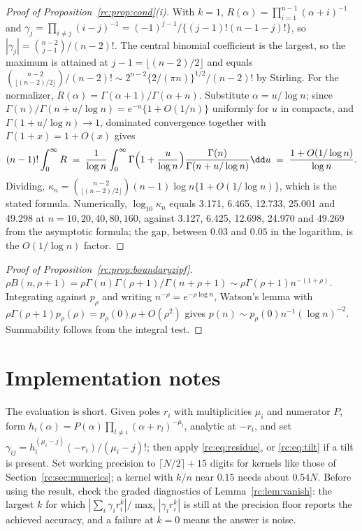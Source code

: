 \begin{proof}[Proof of Proposition~\ref{rc:prop:cond}(i)]
With $k=1$, $R(\alpha)=\prod_{i=1}^{n-1}(\alpha+i)^{-1}$ and $\gamma_j=\prod_{i\ne j}(i-j)^{-1}=(-1)^{j-1}/\{(j-1)!(n-1-j)!\}$, so $|\gamma_j|=\binom{n-2}{j-1}/(n-2)!$. The central binomial coefficient is the largest, so the maximum is attained at $j-1=\lfloor(n-2)/2\rfloor$ and equals $\binom{n-2}{\lfloor(n-2)/2\rfloor}/(n-2)!\sim2^{n-2}\{2/(\pi n)\}^{1/2}/(n-2)!$ by Stirling. For the normalizer, $R(\alpha)=\Gamma(\alpha+1)/\Gamma(\alpha+n)$. Substitute $\alpha=u/\log n$; since $\Gamma(n)/\Gamma(n+u/\log n)=e^{-u}\{1+O(1/n)\}$ uniformly for $u$ in compacts, and $\Gamma(1+u/\log n)\to1$, dominated convergence together with $\Gamma(1+x)=1+O(x)$ gives
\[
(n-1)!\int_0^\infty R\;=\;\frac{1}{\log n}\int_0^\infty\Gamma\Bigl(1+\frac{u}{\log n}\Bigr)\frac{\Gamma(n)}{\Gamma(n+u/\log n)}\dd u\;=\;\frac{1+O(1/\log n)}{\log n}.
\]
Dividing, $\kappa_n=\binom{n-2}{\lfloor(n-2)/2\rfloor}(n-1)\log n\{1+O(1/\log n)\}$, which is the stated formula. Numerically, $\log_{10}\kappa_n$ equals 3.171, 6.465, 12.733, 25.001 and 49.298 at $n=10,20,40,80,160$, against 3.127, 6.425, 12.698, 24.970 and 49.269 from the asymptotic formula; the gap, between $0.03$ and $0.05$ in the logarithm, is the $O(1/\log n)$ factor.
\end{proof}

\begin{proof}[Proof of Proposition~\ref{rc:prop:boundaryzipf}]
$\rho B(n,\rho+1)=\rho\Gamma(n)\Gamma(\rho+1)/\Gamma(n+\rho+1)\sim\rho\Gamma(\rho+1)n^{-(1+\rho)}$. Integrating against $p_\rho$ and writing $n^{-\rho}=e^{-\rho\log n}$, Watson's lemma with $\rho\Gamma(\rho+1)p_\rho(\rho)=p_\rho(0)\rho+O(\rho^2)$ gives $p(n)\sim p_\rho(0)n^{-1}(\log n)^{-2}$. Summability follows from the integral test.
\end{proof}

\section*{Implementation notes}\label{rc:app:impl}

The evaluation is short. Given poles $r_i$ with multiplicities $\mu_i$ and numerator $P$, form $h_i(\alpha)=P(\alpha)\prod_{l\ne i}(\alpha+r_l)^{-\mu_l}$, analytic at $-r_i$, and set $\gamma_{ij}=h_i^{(\mu_i-j)}(-r_i)/(\mu_i-j)!$; then apply \eqref{rc:eq:residue}, or \eqref{rc:eq:tilt} if a tilt is present. Set working precision to $\lceil N/2\rceil+15$ digits for kernels like those of Section~\ref{rc:sec:numerics}; a kernel with $k/n$ near $0.15$ needs about $0.54N$. Before using the result, check the graded diagnostics of Lemma~\ref{rc:lem:vanish}: the largest $k$ for which $|\sum_i\gamma_ir_i^k|/\max_i|\gamma_ir_i^k|$ is still at the precision floor reports the achieved accuracy, and a failure at $k=0$ means the answer is noise.

